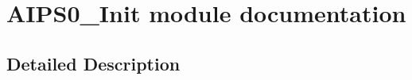 \hypertarget{group___a_i_p_s0___init__module}{}\section{A\+I\+P\+S0\+\_\+\+Init module documentation}
\label{group___a_i_p_s0___init__module}


\subsection{Detailed Description}
